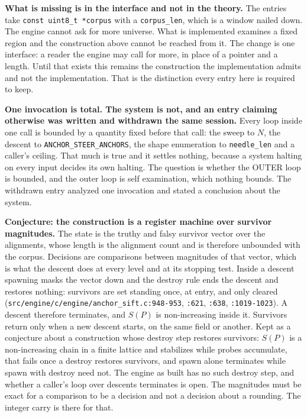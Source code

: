 \textbf{What is missing is in the interface and not in the theory.} The entries take \texttt{const uint8\_t *corpus} with a \texttt{corpus\_len}, which is a window nailed down. The engine cannot ask for more universe. What is implemented examines a fixed region and the construction above cannot be reached from it. The change is one interface: a reader the engine may call for more, in place of a pointer and a length. Until that exists this remains the construction the implementation admits and not the implementation. That is the distinction every entry here is required to keep.

\textbf{One invocation is total. The system is not, and an entry claiming otherwise was written and withdrawn the same session.} Every loop inside one call is bounded by a quantity fixed before that call: the sweep to \(N\), the descent to \texttt{ANCHOR\_STEER\_ANCHORS}, the shape enumeration to \texttt{needle\_len} and a caller's ceiling. That much is true and it settles nothing, because a system halting on every input decides its own halting. The question is whether the OUTER loop is bounded, and the outer loop is self examination, which nothing bounds. The withdrawn entry analyzed one invocation and stated a conclusion about the system.

\textbf{Conjecture: the construction is a register machine over survivor magnitudes.} The state is the truthy and falsy survivor vector over the alignments, whose length is the alignment count and is therefore unbounded with the corpus. Decisions are comparisons between magnitudes of that vector, which is what the descent does at every level and at its stopping test. Inside a descent spawning masks the vector down and the destroy rule ends the descent and restores nothing: survivors are set standing once, at entry, and only cleared (\texttt{src/\allowbreak{}engine/\allowbreak{}c/\allowbreak{}engine/\allowbreak{}anchor\_sift.c:948-953}, \texttt{:621}, \texttt{:638}, \texttt{:1019-1023}). A descent therefore terminates, and \(S(P)\) is non-increasing inside it. Survivors return only when a new descent starts, on the same field or another. Kept as a conjecture about a construction whose destroy step restores survivors: \(S(P)\) is a non-increasing chain in a finite lattice and stabilizes while probes accumulate, that fails once a destroy restores survivors, and spawn alone terminates while spawn with destroy need not. The engine as built has no such destroy step, and whether a caller's loop over descents terminates is open. The magnitudes must be exact for a comparison to be a decision and not a decision about a rounding. The integer carry is there for that.

